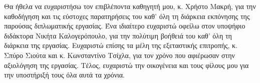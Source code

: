 \begin{acknowledgements}
    Θα ήθελα να ευχαριστήσω τον επιβλέποντα καθηγητή μου, κ.
    Χρήστο Μακρή, για την καθοδήγηση και τις εύστοχες παρατηρήσεις του καθ' όλη τη διάρκεια εκπόνησης της παρούσας διπλωματικής εργασίας.
    Ένα ιδιαίτερο ευχαριστώ οφείλω στον υποψήφιο διδάκτορα Νικήτα Καλογερόπουλο, για την πολύτιμη βοήθειά του καθ' όλη τη διάρκεια της εργασίας.
    Ευχαριστώ επίσης τα μέλη της εξεταστικής επιτροπής, κ.
    Σπύρο Σιούτα και κ.
    Κωνσταντίνο Τσίχλα, για τον χρόνο που αφιέρωσαν στην αξιολόγηση της εργασίας.
    Τέλος, ευχαριστώ την οικογένεια και τους φίλους μου για την υποστήριξή τους όλα αυτά τα χρόνια.
\end{acknowledgements}

